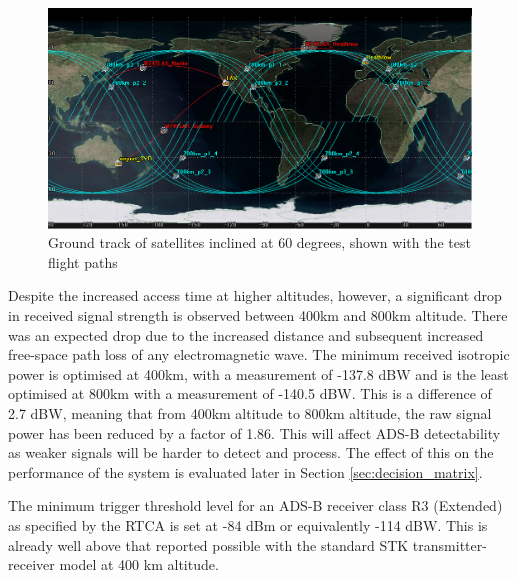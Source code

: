 \begin{figure}[htbp]
	\centering
	\includegraphics[scale = 0.6]{Pictures/12sat_60deg_flightPaths.png}
	
	\caption{Ground track of satellites inclined at 60 degrees, shown with the test flight paths}
	\label{fig:12sat_60deg_flightPaths}
\end{figure} 

Despite the increased access time at higher altitudes, however, a significant drop in received signal strength is observed between 400km and 800km altitude. There was an expected drop due to the increased distance and subsequent increased free-space path loss of any electromagnetic wave.  The minimum received isotropic power is optimised at 400km, with a measurement of -137.8 dBW and is the least optimised at 800km with a measurement of -140.5 dBW. This is a difference of 2.7 dBW, meaning that from 400km altitude to 800km altitude, the raw signal power has been reduced by a factor of 1.86. This will affect ADS-B detectability as weaker signals will be harder to detect and process. The effect of this on the performance of the system is evaluated later in Section \ref{sec:decision_matrix}.

The minimum trigger threshold level for an ADS-B receiver class R3 (Extended) as specified by the RTCA is set at -84 dBm \cite{RTCA_MODE_S} or equivalently -114 dBW. This is already well above that reported possible with the standard STK transmitter-receiver model at 400 km altitude. 


  
 